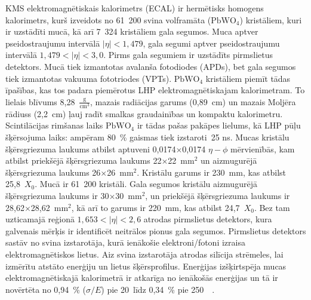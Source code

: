 KMS elektromagnētiskais kalorimetrs (ECAL) ir hermētisks homogens kalorimetrs, kurš izveidots no 61~200 svina volframāta ($\text{PbWO}_{4}$) kristāliem, kuri ir uzstādīti mucā, kā arī 7~324 kristāliem gala segumos. Muca aptver pseido\gls{straujumu} intervālā $\left|\eta\right|<1,479$, gala segumi aptver pseidostraujumu intervālā $1,479<\left|\eta\right|<3,0$. Pirms gala segumiem ir uzstādīts pirmslietus detektors. Mucā tiek izmantotas avalanša fotodiodes (APDs), bet gala segumos tiek izmantotas vakuuma fototriodes (VPTs). $\text{PbWO}_{4}$ kristāliem piemīt tādas īpašības, kas tos padara piemērotus LHP elektromagnētiskajam kalorimetram. To lielais blīvums 8,28~$\frac{\text{g}}{\text{cm}^3}$, mazais radiācijas garums (0,89~cm) un mazais Moljēra rādiuss (2,2~cm) ļauj radīt smalkas graudainības un kompaktu kalorimetru. Scintilācijas rimšanas laiks $\text{PbWO}_{4}$ ir tādas pašas pakāpes lielums, kā LHP pūļu šķērsojuma laiks: ampēram 80~\% gaismas tiek izstaroti~25 ns. Mucas kristālu šķērsgriezuma laukums atbilst aptuveni 0,0174$\times$0,0174 $\eta-\phi$ mērvienībās, kam atbilst priekšējā šķērsgriezuma laukums 22$\times$22~$\text{mm}^2$ un aizmugurējā šķērsgriezuma laukums 26$\times$26~$\text{mm}^2$. Kristālu garums ir 230~mm, kas atbilst 25,8~$X_{0}$. Mucā ir 61~200 kristāli. Gala segumos kristālu aizmugurējā šķērsgriezuma laukums ir 30$\times$30~$\text{mm}^2$, un priekšējā šķērsgriezuma laukums ir 28,62$\times$28,62~$\text{mm}^2$, kā arī to garums ir 220~mm, kas atbilst 24,7~$X_{0}$. Bez tam \gls{uzticamajā reģionā} $1,653<\left|\eta\right|<2,6$ atrodas pirmslietus detektors, kura galvenais mērķis ir identificēt neitrālos pionus gala segumos. Pirmslietus detektors sastāv no svina izstarotāja, kurā ienākošie elektroni/fotoni izraisa elektromagnētiskos lietus. Aiz svina izstarotāja atrodas silīcija strēmeles, lai izmērītu atstāto enerģiju un lietus šķērsprofilus. Enerģijas izšķirtspēja mucas elektromagnētiskajā kalorimetrā ir atkarīga no ienākošās enerģijas un tā ir novērtēta no 0,94~\% ($\sigma/E$) pie 20~\GeV līdz 0,34~\% pie 250~\GeV~\cite{Adzic:2007mi}. 

